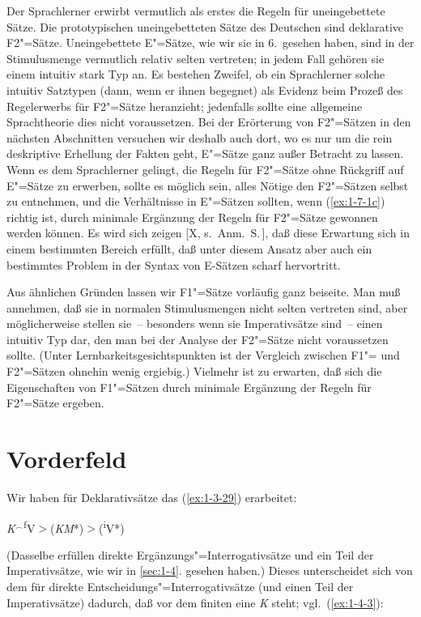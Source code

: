 \documentclass[output=paper]{langsci/langscibook}
\begin{document}
\ssubsection{}%
\label{subsec:1-7.5}
Der Sprachlerner erwirbt vermutlich als erstes die Regeln für uneingebettete
Sätze. Die prototypischen uneingebetteten Sätze des Deutschen sind deklarative F2"=Sätze. Uneingebettete E"=Sätze, wie wir sie in 6.\ gesehen haben, sind in der Stimulusmenge vermutlich relativ selten vertreten; in jedem Fall gehören sie einem intuitiv
stark  Typ an. Es bestehen Zweifel, ob ein Sprachlerner solche intuitiv
 Satztypen (dann, wenn er ihnen begegnet) als Evidenz beim Prozeß des
Regelerwerbs für F2"=Sätze heranzieht; jedenfalls sollte eine allgemeine Sprachtheorie
dies nicht voraussetzen. Bei der Erörterung von F2"=Sätzen in den nächsten Abschnitten versuchen wir deshalb auch dort, wo es nur um die rein deskriptive Erhellung
der Fakten geht, E"=Sätze ganz außer Betracht zu lassen. Wenn es dem Sprachlerner
gelingt, die Regeln für F2"=Sätze ohne Rückgriff auf E"=Sätze zu erwerben, sollte es
möglich sein, alles Nötige den F2"=Sätzen selbst zu entnehmen, und die Verhältnisse
in E"=Sätzen sollten, wenn (\ref{ex:1-7-1c}) richtig ist, durch minimale Ergänzung der Regeln für
F2"=Sätze gewonnen werden können. Es wird sich zeigen [X, s.\ Anm.\ S.\,\pageref{fn-herausgeber-topo}]\label{X:4}, daß diese Erwartung sich
in einem bestimmten Bereich erfüllt, daß unter diesem Ansatz aber auch ein bestimmtes Problem in der Syntax von E-Sätzen scharf hervortritt.

Aus ähnlichen Gründen lassen wir F1"=Sätze vorläufig ganz beiseite. Man muß annehmen, daß sie in normalen Stimulusmengen nicht selten vertreten sind, aber möglicherweise stellen sie~-- besonders wenn sie Imperativsätze sind~-- einen intuitiv
 Typ dar, den man bei der Analyse der  F2"=Sätze nicht
voraussetzen sollte. (Unter Lernbarkeitsgesichtspunkten ist der Vergleich zwischen
F1"= und F2"=Sätzen ohnehin wenig ergiebig.) Vielmehr ist zu erwarten, daß sich die
Eigenschaften von F1"=Sätzen durch minimale Ergänzung der Regeln für F2"=Sätze ergeben.
\section{Vorderfeld}%
\label{sec:1-8}



Wir haben für Deklarativsätze das  (\ref{ex:1-3-29}) erarbeitet:
\begin{exe}
\exi{(\ref{ex:1-3-29})}%
\textit{K}$^{\smallfrown}$\textsuperscript{f}V$>$(\textit{KM}*)$>$(\textsuperscript{i}V*)
\end{exe}
(Dasselbe  erfüllen direkte Ergänzungs"=Interrogativsätze und ein Teil der Imperativsätze, wie wir in \ref{sec:1-4}. gesehen haben.) Dieses  unterscheidet sich von
dem für direkte Entscheidungs"=Interrogativsätze (und einen Teil der Imperativsätze)
dadurch, daß vor dem finiten  eine  \textit{K} steht; vgl.\ (\ref{ex:1-4-3}):
\end{document}
